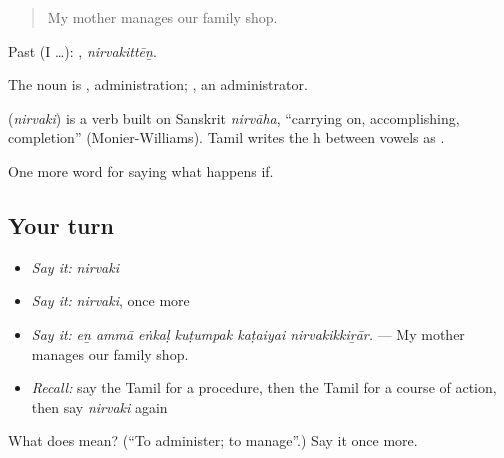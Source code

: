 \begin{quote}
My mother manages our family shop.
\end{quote}

Past (I …): , \emph{nirvakittēṉ}.

The noun is , administration; , an administrator.

\begin{cousinweb}
\textbf{} (\emph{nirvaki}) is a verb built on Sanskrit \emph{nirvāha}, \textquotedblleft{}carrying on, accomplishing, completion\textquotedblright{} (Monier-Williams). Tamil writes the h between vowels as .
\end{cousinweb}

\begin{grammarlens}[title={What you've built}]
One more word for saying what happens if.
\end{grammarlens}

\subsection*{Your turn}
\begin{itemize}
\raggedright
  \item \emph{Say it:} \emph{nirvaki}
  \item \emph{Say it:} \emph{nirvaki}, once more
  \item \emph{Say it:} \emph{eṉ ammā eṅkaḷ kuṭumpak kaṭaiyai nirvakikkiṟār.} — My mother manages our family shop.
  \item \emph{Recall:} say the Tamil for a procedure, then the Tamil for a course of action, then say \emph{nirvaki} again
\end{itemize}

\begin{tcolorbox}[breakable,colback=teal!4,colframe=teal!35!black,title={Before you move on}]
What does  mean? (\textquotedblleft{}To administer; to manage\textquotedblright{}.) Say it once more.
\end{tcolorbox}

